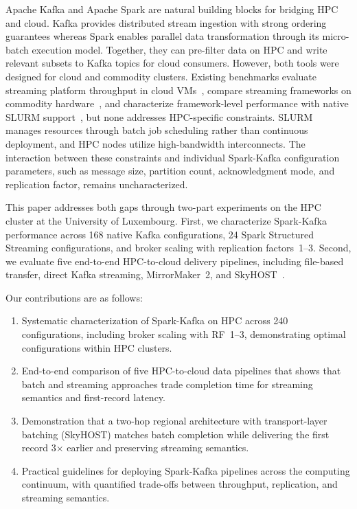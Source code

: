 \documentclass[runningheads]{llncs}
\begin{document}
Apache Kafka and Apache Spark are natural building blocks for bridging HPC and cloud. Kafka provides distributed stream ingestion with strong ordering guarantees whereas Spark enables parallel data transformation through its micro-batch execution model. Together, they can pre-filter data on HPC and write relevant subsets to Kafka topics for cloud consumers. However, both tools were designed for cloud and commodity clusters. Existing benchmarks evaluate streaming platform throughput in cloud VMs~\cite{lopez2016performance}, compare streaming frameworks on commodity hardware~\cite{chintapalli2016benchmarking}, and characterize framework-level performance with native SLURM support~\cite{kulkarni2025sprobench}, but none addresses HPC-specific constraints. SLURM manages resources through batch job scheduling rather than continuous deployment, and HPC nodes utilize high-bandwidth interconnects. The interaction between these constraints and individual Spark-Kafka configuration parameters, such as message size, partition count, acknowledgment mode, and replication factor, remains uncharacterized.

This paper addresses both gaps through two-part experiments on the HPC cluster at the University of Luxembourg. First, we characterize Spark-Kafka performance across 168 native Kafka configurations, 24 Spark Structured Streaming configurations, and broker scaling with replication factors~1--3. Second, we evaluate five end-to-end HPC-to-cloud delivery pipelines, including file-based transfer, direct Kafka streaming, MirrorMaker~2, and SkyHOST~\cite{tariq2026skyhost}.


Our contributions are as follows:
\begin{enumerate}
    \item Systematic characterization of Spark-Kafka on HPC across 240 configurations, including broker scaling with RF~1--3, demonstrating optimal configurations within HPC clusters. 
    
    \item End-to-end comparison of five HPC-to-cloud data pipelines that shows that batch and streaming approaches trade completion time for streaming semantics and first-record latency.
    
    \item Demonstration that a two-hop regional architecture with transport-layer batching (SkyHOST) matches batch completion while delivering the first record 3$\times$ earlier and preserving streaming semantics.
    
    \item Practical guidelines for deploying Spark-Kafka pipelines across the computing continuum, with quantified trade-offs between throughput, replication, and streaming semantics.
\end{enumerate}
\end{document}
